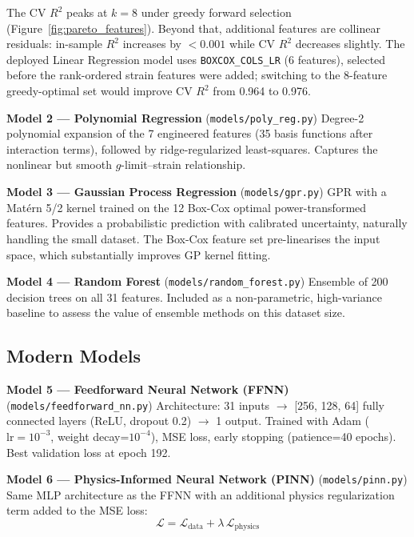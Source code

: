 \documentclass[10pt,letterpaper]{article}
\newcommand{\Rsq}{R^2}
\begin{document}
The CV $\Rsq$ peaks at $k=8$ under greedy forward selection
(Figure~\ref{fig:pareto_features}). Beyond that, additional features are collinear residuals:
in-sample $\Rsq$ increases by ${<}0.001$ while CV $\Rsq$ decreases slightly. The deployed
Linear Regression model uses \texttt{BOXCOX\_COLS\_LR} (6 features), selected before the
rank-ordered strain features were added; switching to the 8-feature greedy-optimal set would
improve CV $\Rsq$ from 0.964 to 0.976.

\textbf{Model 2 --- Polynomial Regression} (\texttt{models/poly\_reg.py})
Degree-2 polynomial expansion of the 7 engineered features (35 basis functions after
interaction terms), followed by ridge-regularized least-squares. Captures the nonlinear but
smooth $g$-limit--strain relationship.

\textbf{Model 3 --- Gaussian Process Regression} (\texttt{models/gpr.py})
GPR with a Mat\'{e}rn 5/2 kernel trained on the 12 Box-Cox optimal power-transformed
features. Provides a probabilistic prediction with calibrated uncertainty, naturally handling
the small dataset. The Box-Cox feature set pre-linearises the input space, which substantially
improves GP kernel fitting.

\textbf{Model 4 --- Random Forest} (\texttt{models/random\_forest.py})
Ensemble of 200 decision trees on all 31 features. Included as a non-parametric,
high-variance baseline to assess the value of ensemble methods on this dataset size.

\subsection{Modern Models}

\textbf{Model 5 --- Feedforward Neural Network (FFNN)}
(\texttt{models/feedforward\_nn.py})
Architecture: 31 inputs $\rightarrow$ [256, 128, 64] fully connected layers (ReLU,
dropout 0.2) $\rightarrow$ 1 output. Trained with Adam ($\text{lr}=10^{-3}$, weight
decay=$10^{-4}$), MSE loss, early stopping (patience=40 epochs). Best validation loss at
epoch 192.

\textbf{Model 6 --- Physics-Informed Neural Network (PINN)} (\texttt{models/pinn.py})
Same MLP architecture as the FFNN with an additional physics regularization term added to
the MSE loss:
\begin{equation}
  \mathcal{L} = \mathcal{L}_{\text{data}} + \lambda\,\mathcal{L}_{\text{physics}}
  \label{eq:pinn_loss}
\end{equation}
\end{document}
